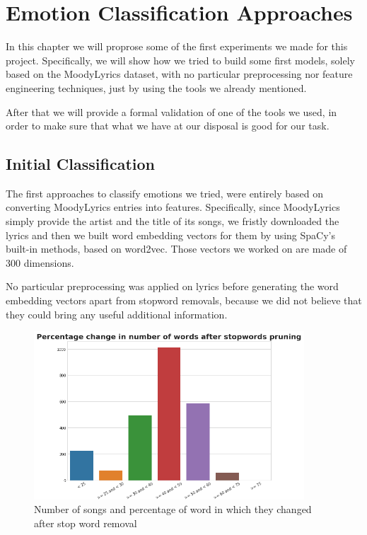 \chapter{Emotion Classification Approaches}

In this chapter we will proprose some of the first experiments we made for this
project. Specifically, we will show how we tried to build some first models, solely 
based on the MoodyLyrics dataset, with no particular preprocessing nor feature
engineering techniques, just by using the tools we already mentioned.

After that we will provide a formal validation of one of the tools we used, in
order to make sure that what we have at our disposal is good for our task.

\section{Initial Classification}

The first approaches to classify emotions we tried, were entirely based on converting
MoodyLyrics entries into features. Specifically, since MoodyLyrics simply provide the
artist and the title of its songs, we fristly downloaded the lyrics and then we built
word embedding vectors for them by using SpaCy's built-in methods, based on word2vec.
Those vectors we worked on are made of 300 dimensions.

No particular preprocessing was applied on lyrics before generating the word embedding
vectors apart from stopword removals, because we did not believe that they could bring
any useful additional information.

\begin{figure}
  \centering
  \includegraphics[width=0.9\textwidth]{./chapters/chapter4/images/percentage-change.png}
  \caption{Number of songs and percentage of word in which they changed after stop word removal}
  \label{fig:ml-percentage-change}
\end{figure}

